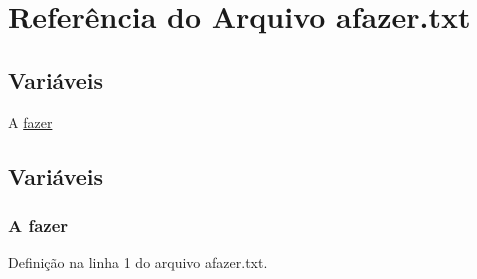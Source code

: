 \hypertarget{afazer_8txt}{}\section{Referência do Arquivo afazer.\+txt}
\label{afazer_8txt}
\subsection*{Variáveis}
\begin{DoxyCompactItemize}
\item 
A \hyperlink{afazer_8txt_ae4b3f314495c5a1657748cc41985871d}{fazer}
\end{DoxyCompactItemize}


\subsection{Variáveis}
\subsubsection[{\texorpdfstring{fazer}{fazer}}]{\setlength{\rightskip}{0pt plus 5cm}A fazer}\hypertarget{afazer_8txt_ae4b3f314495c5a1657748cc41985871d}{}\label{afazer_8txt_ae4b3f314495c5a1657748cc41985871d}


Definição na linha 1 do arquivo afazer.\+txt.

